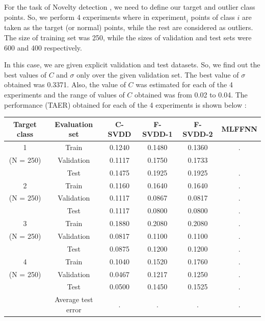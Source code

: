 \documentclass{article} %
\begin{document}
For the task of Novelty detection , we need to define our target and outlier class points. So, we perform 4 experiments where in $\text{experiment}_{i}$ points of class $i$ are taken as the target (or normal) points, while the rest are considered as outliers. The size of training set was 250, while the sizes of validation and test sets were 600 and 400 respectively.

In this case, we are given explicit validation and test datasets. So, we find out the best values of $C$ and $\sigma$ only over the given validation set. The best value of $\sigma$ obtained was 0.3371. Also, the value of $C$ was estimated for each of the 4 experiments and the range of values of $C$ obtained was from 0.02 to 0.04.
The performance (TAER) obtained for each of the 4 experiments is shown below : \\[5pt]

\begin{tabular}{|c|c|c|c|c|c|}
\hline
Target class & Evaluation set & C-SVDD & F-SVDD-1 & F-SVDD-2 & MLFFNN \\ \hline
 1 & Train & 0.1240 & 0.1480 & 0.1360 & . \\ 
 (N = 250) & Validation & 0.1117 & 0.1750 & 0.1733 &  \\ 
 & Test &  0.1475 & 0.1925 &  0.1925 & . \\ \hline
 
 2 & Train & 0.1160 & 0.1640 & 0.1640 & . \\ 
  (N = 250)& Validation &  0.1117  &  0.0867 &  0.0817 & . \\ 
 & Test &  0.1117  &  0.0800 & 0.0800  & . \\ \hline
 
 
 3 & Train & 0.1880 & 0.2080  & 0.2080 & . \\ 
 (N = 250) & Validation & 0.0817 & 0.1100 &  0.1100 & . \\ 
 & Test &  0.0875 &  0.1200 & 0.1200  & . \\ \hline
 
 
 4 & Train & 0.1040 & 0.1520 &  0.1760 & . \\ 
 (N = 250) & Validation &  0.0467 & 0.1217 & 0.1250 & . \\ 
 & Test & 0.0500 &  0.1450 &  0.1525 & . \\ \hline
 
& Average test error  & . & .& . &. \\ \hline
\end{tabular} \\[10pt]
\end{document}

